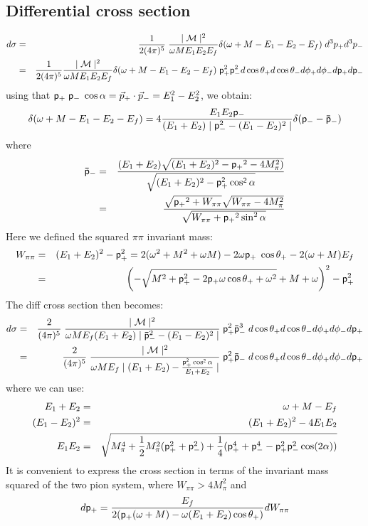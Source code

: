 \documentclass[12pt,epsfig]{article}
\newcommand{\beq}{\begin{equation}}
\newcommand{\eeq}{\end{equation}}
\newcommand{\bea}{\begin{eqnarray}}
\newcommand{\eea}{\end{eqnarray}}
\begin{document}
  \subsection{Differential cross section}
  \bea
  d\sigma&=& \frac{1}{2(4\pi)^5}\; \frac{ \mid {\cal{M}}\mid^2  }{\omega M E_1 E_2 E_f} \delta(\omega +M-E_1-E_2-E_f)\;d^3 p_+ d^3 p_-\nonumber\\
&=&  \frac{1}{2(4\pi)^5}\frac{ \mid {\cal{M}}\mid^2  }{\omega M E_1 E_2 E_f} \delta(\omega +M-E_1-E_2-E_f)\;     { \sf{ p}}_+ ^2 { \sf{ p}}_-^2 d\cos\theta_+ d\cos\theta_- d\phi_+ d\phi_- d{\sf{p}}_+ d{\sf{p}}_-\nonumber
  \eea
using that ${ \sf{ p}}_+\;  {\sf{ p}}_-\; \cos\alpha= \vec{{ p}}_+\cdot  \vec{{ p}}_-=E_1^2-E_2^2$, we obtain:
\beq
 \delta(\omega+M-E_1-E_2-E_f) =4\frac{E_1 E_2 {\sf{p}_-}}{(E_1+E_2)\mid {\sf{p}}_-^2- (E_1-E_2)^2\mid} \delta({\sf{p}}_--{\sf{\bar p}}_-)
\eeq  
  where
  \bea
{ \sf{\bar p}}_-&=&\frac{(E_1+E_2) \sqrt{(E_1+E_2)^2-{\sf{p}_+}^2-4M_\pi^2)}}{  \sqrt{(E_1+E_2)^2-\sf{p}_+^2\cos^2\alpha}}\nonumber\\
&=& \frac{\sqrt{{\sf{p}_+}^2 +W_{\pi\pi}} \sqrt{W_{\pi\pi}-4 M_\pi^2}}{\sqrt{W_{\pi\pi}+{\sf{p}_+}^2 \sin^2 \alpha}}  \eea
  Here we defined the squared $\pi\pi$ invariant mass:
  \bea
  W_{\pi\pi}&=&(E_1+E_2)^2-{ \sf{ p}}_+ ^2=2(\omega^2+M^2+\omega M)-2\omega { \sf{ p}}_+\; \cos\theta_+-2(\omega+M)E_f\nonumber\\
 &=&\left(-\sqrt{M^2+{ \sf{ p}}_+^2-2 { \sf{ p}}_+ \omega  \cos \theta _++\omega ^2}+M+\omega \right)^2-{ \sf{ p}}_+^2  \eea
  The diff cross section then becomes:
  \bea
  d\sigma &=&\frac{2}{(4\pi)^5}\;\frac{ \mid {\cal{M}}\mid^2  }{\omega M   E_f (E_1+E_2) \mid { \sf{\bar  p}}_-^2-(E_1-E_2)^2\mid} \; { \sf{ p}}_+ ^2 { \sf{\bar  p}}_-^3 \;d\cos\theta_+ d\cos\theta_- d\phi_+ d\phi_- d{\sf{p}}_+\nonumber\\
  &=&\frac{2}{(4\pi)^5}\;\frac{ \mid {\cal{M}}\mid^2  }{\omega M   E_f  \mid (E_1+E_2)- \frac{\sf{ p}_+^2\cos^2\alpha}{E_1+E_2}\mid} \; { \sf{ p}}_+ ^2 { \sf{\bar  p}}_- \;d\cos\theta_+ d\cos\theta_- d\phi_+ d\phi_- d{\sf{p}}_+
  \eea
  where we can use:
  \bea
  E_1+E_2&=& \omega+M-E_f\nonumber\\
  (E_1-E_2)^2&=&(E_1+E_2)^2-4 E_1 E_2\nonumber\\
  E_1 E_2&=&\sqrt{M_\pi^4+\frac 12 M_\pi^2({ \sf{ p}}_+ ^2+{ \sf{ p}}_- ^2)+\frac 14 ({ \sf{ p}}_+ ^4 +{ \sf{ p}}_- ^4-{ \sf{ p}}_+ ^2{ \sf{ p}}_- ^2 \cos(2\alpha))}
  \eea
  It is convenient to express the cross section in terms of the invariant mass squared of the two pion system, where $W_{\pi\pi}>4 M_\pi^2$ and 
  \beq
  d{ \sf{ p}}_+ =\frac{E_f}{2({ \sf{ p}}_+ (\omega+M)-\omega (E_1+E_2)\cos\theta_+)}dW_{\pi\pi}
  \eeq
  
\end{document}
